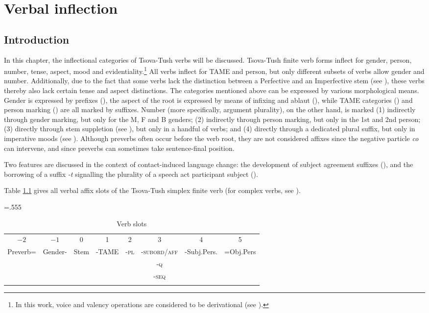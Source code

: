 \chapter{Verbal inflection} \label{inflection}

\section{Introduction}

In this chapter, the inflectional categories of Tsova-Tush verbs will be discussed. Tsova-Tush finite verb forms inflect for gender, person, number, tense, aspect, mood and evidentiality.\footnote{In this work, voice and valency operations are considered to be derivational (see ).} All verbs inflect for TAME and person, but only different subsets of verbs allow gender and number. Additionally, due to the fact that some verbs lack the distinction between a Perfective and an Imperfective stem (see ), these verbs thereby also lack certain tense and aspect distinctions. The categories mentioned above can be expressed by various morphological means. Gender is expressed by prefixes (), the aspect of the root is expressed by means of infixing and ablaut (), while TAME categories () and person marking () are all marked by suffixes. Number (more specifically, argument plurality), on the other hand, is marked (1) indirectly through gender marking, but only for the M, F and B genders; (2) indirectly through person marking, but only in the 1st and 2nd person; (3) directly through stem suppletion (see ), but only in a handful of verbs; and (4) directly through a dedicated plural suffix, but only in imperative moods (see ). Although preverbs often occur before the verb root, they are not considered affixes since the negative particle \textit{co} can intervene, and since preverbs can sometimes take sentence-final position. 


Two features are discussed in the context of contact-induced language change: the development of subject agreement suffixes (), and the borrowing of a suffix \textit{-t} signalling the plurality of a speech act participant subject ().

Table \ref{slots} gives all verbal affix slots of the Tsova-Tush simplex finite verb (for complex verbs, see ).
\pagebreak
\begin{table}
	\tabcolsep=.555\tabcolsep
	\begin{tabular}{cccccccc}
	\lsptoprule
		$-2$ & $-1$ & 0 & 1 & 2 & 3 & 4 & 5\\
		Preverb= & Gender- & Stem & -TAME & \textsc{-pl} & \textsc{-subord/aff} & -Subj.Pers. & =Obj.Pers \\
		& & & & & \textsc{-q} & & \\
		& & & & & \textsc{-seq} & & \\
	\lspbottomrule
	\end{tabular}
	\caption{Verb slots}
	\label{slots}
\end{table}

